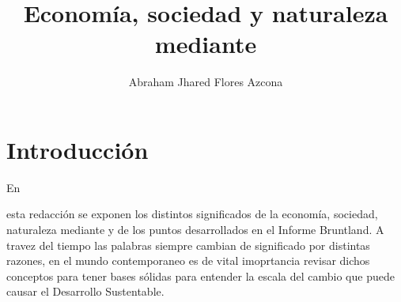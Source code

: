 \documentclass[stu, 12pt, letterpaper, donotrepeattitle, floatsintext, natbib]{apa7}
\title{\Large Economía, sociedad y naturaleza mediante}
\author{Abraham Jhared Flores Azcona} %
\affiliation{Instituto Tecnológico de Tijuana}
\begin{document}
\maketitle


\renewcommand\contentsname{Contenido}
\tableofcontents

\newpage
\section{Introducción}
En \begin{justifying}
    esta redacción se exponen los distintos significados de la economía, sociedad, naturaleza mediante y de los puntos desarrollados en el Informe Bruntland. A travez del tiempo
las palabras siempre cambian de significado por distintas razones, en el mundo contemporaneo es de vital imoprtancia revisar dichos conceptos para tener bases sólidas para entender 
la escala del cambio que puede causar el Desarrollo Sustentable.\par
\end{justifying}
\vspace{\baselineskip}
\end{document}
